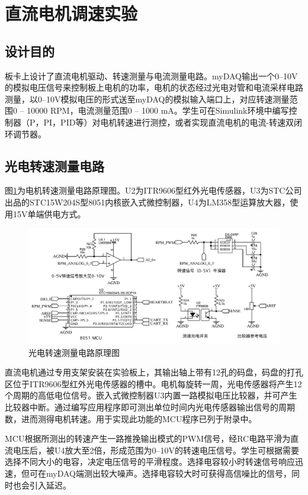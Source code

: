 \documentclass[11pt,a4paper]{article}
\begin{document}
\section{直流电机调速实验}

\subsection{设计目的}
板卡上设计了直流电机驱动、转速测量与电流测量电路。myDAQ输出一个0--10V的模拟电压信号来控制板上电机的功率，电机的状态经过光电对管和电流采样电路测量，以0--10V模拟电压的形式送至myDAQ的模拟输入端口上，对应转速测量范围0 -- 10000 RPM，电流测量范围0 -- 1000 mA。学生可在Simulink环境中编写控制器（P，PI，PID等）对电机转速进行测控，或者实现直流电机的电流-转速双闭环调节器。

\subsection{光电转速测量电路}
图\ref{speed_measure_sch}为电机转速测量电路原理图。U2为ITR9606型红外光电传感器，U3为STC公司出品的STC15W204S型8051内核嵌入式微控制器，U4为LM358型运算放大器，使用15V单端供电方式。
\begin{figure}[h!]\centering
  \includegraphics[width=14cm]{./figs/speed_measure_sch.pdf}
  \caption{光电转速测量电路原理图}\label{speed_measure_sch}
\end{figure}

直流电机通过专用支架安装在实验板上，其输出轴上带有12孔的码盘，码盘的打孔区位于ITR9606型红外光电传感器的槽中。电机每旋转一周，光电传感器将产生12个周期的高低电位信号。嵌入式微控制器U3内置一路模拟电压比较器，并可产生比较器中断。通过编写应用程序即可测出单位时间内光电传感器输出信号的周期数，进而测得电机转速。用于实现此功能的MCU程序已列于附录中。

MCU根据所测出的转速产生一路推挽输出模式的PWM信号，经RC电路平滑为直流电压后，被U4放大至2倍，形成范围为0--10V的转速电压信号。学生可根据需要选择不同大小的电容，决定电压信号的平滑程度。选择电容较小时转速信号响应迅速，但可在myDAQ端测出较大噪声。选择电容较大时可获得高信噪比的信号，同时也会引入延迟。
\end{document}
